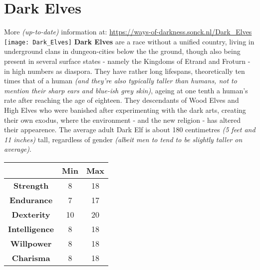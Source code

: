 \documentclass[openany,10pt,a4paper]{book}
\begin{document}
\section{Dark Elves}
More \textit{(up-to-date)} information at: \url{https://ways-of-darkness.sonck.nl/Dark_Elves}\newline
\texttt{[image: Dark\_Elves]}\newline
\textbf{Dark Elves} are a race without a unified country, living in underground clans in dungeon-cities below the the ground, though also being present in several surface states - namely the Kingdoms of Etrand and Froturn - in high numbers as diaspora. They have rather long lifespans, theoretically ten times that of a human \textit{(and they're also typically taller than humans, not to mention their sharp ears and blue-ish grey skin)}, ageing at one tenth a human's rate after reaching the age of eighteen. They descendants of Wood Elves and High Elves who were banished after experimenting with the dark arts, creating their own exodus, where the environment - and the new religion - has altered their appearence. The average adult Dark Elf is about 180 centimetres \textit{(5 feet and 11 inches)} tall, regardless of gender \textit{(albeit men to tend to be slightly taller on average)}.\newline
\begin{tabular}{|c|c|c|}
\hline
 & \textbf{Min} & \textbf{Max} \\ \hline
\textbf{Strength} & 8 & 18 \\ \hline
\textbf{Endurance} & 7 & 17 \\ \hline
\textbf{Dexterity} & 10 & 20 \\ \hline
\textbf{Intelligence} & 8 & 18 \\ \hline
\textbf{Willpower} & 8 & 18 \\ \hline
\textbf{Charisma} & 8 & 18 \\ \hline
\end{tabular}\newline
{} \newpage
\end{document}
